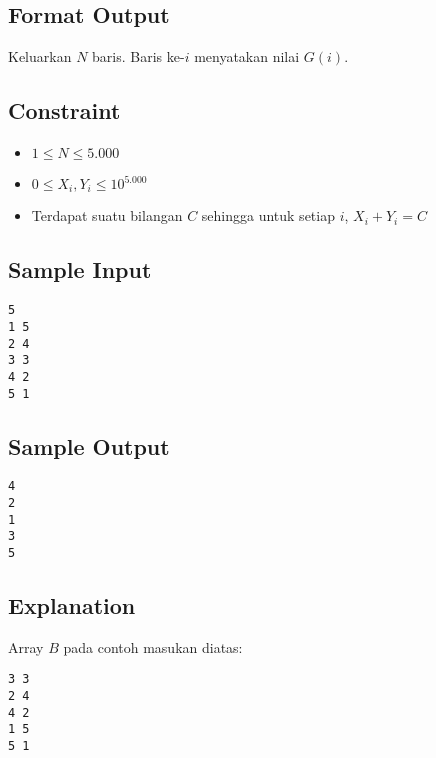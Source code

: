 \subsection*{Format Output}

\par\noindent Keluarkan $N$ baris. Baris ke-$i$ menyatakan nilai $G(i)$.




\subsection*{Constraint}

\begin{itemize}
    \item $1 \leq N \leq 5.000$
    \item $0 \leq X_i, Y_i \leq 10^{5.000}$
    \item Terdapat suatu bilangan $C$ sehingga untuk setiap $i$, $X_i + Y_i = C$
\end{itemize}




\subsection*{Sample Input}

\begin{lstlisting}
5
1 5
2 4
3 3
4 2
5 1
\end{lstlisting}




\subsection*{Sample Output}

\begin{lstlisting}
4
2
1
3
5
\end{lstlisting}




\subsection*{Explanation}

\par\noindent Array $B$ pada contoh masukan diatas:
\begin{lstlisting}
3 3
2 4
4 2
1 5
5 1
\end{lstlisting}
